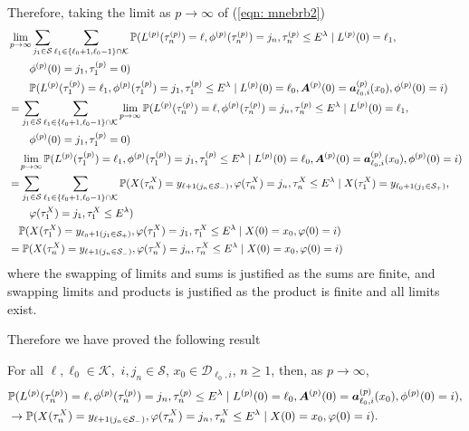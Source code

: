 Therefore, taking the limit as \(p\to \infty \) of (\ref{eqn: mnebrb2}) 
\begin{align}
	&\lim_{p\to\infty}\sum_{j_1\in\mathcal S}\sum_{\ell_1\in\{\ell_0+1,\ell_0-1\}\cap \mathcal K}\mathbb P(L^{(p)}(\tau_n^{(p)}) = \ell, \phi^{(p)}(\tau_n^{(p)}) = j_n, \tau_{n}^{(p)}\leq E^\lambda 
	 \mid L^{(p)}(0)=\ell_1, \nonumber
	  \\&\qquad  \phi^{(p)}(0)=j_1, 
	 \tau_1^{(p)}=0) \nonumber 
	 \\&\qquad \mathbb P(L^{(p)}(\tau_1^{(p)})=\ell_1, \phi^{(p)}(\tau_1^{(p)}) = j_1, \tau_{1}^{(p)}\leq E^\lambda
	 \mid L^{(p)}(0)=\ell_0, \boldsymbol A^{(p)}(0)=\boldsymbol  a_{\ell_0,i}^{(p)}(x_0), \phi^{(p)}(0)=i) \nonumber
	 \\&= \sum_{j_1\in\mathcal S}\sum_{\ell_1\in\{\ell_0+1,\ell_0-1\}\cap \mathcal K} \lim_{p\to\infty} \mathbb P(L^{(p)}(\tau_n^{(p)}) = \ell, \phi^{(p)}(\tau_n^{(p)}) = j_n, \tau_{n}^{(p)}\leq E^\lambda 
	 \mid L^{(p)}(0)=\ell_1, \nonumber
	  \\&\qquad  \phi^{(p)}(0)=j_1, \tau_1^{(p)}=0) \nonumber
	 \\&\quad \lim_{p\to\infty}\mathbb P(L^{(p)}(\tau_1^{(p)})=\ell_1, \phi^{(p)}(\tau_1^{(p)}) = j_1, \tau_{1}^{(p)}\leq E^\lambda
	 \mid L^{(p)}(0)=\ell_0, \boldsymbol A^{(p)}(0)=\boldsymbol  a_{\ell_0,i}^{(p)}(x_0), \phi^{(p)}(0)=i)\nonumber
	 \\&= \sum_{j_1\in\mathcal S}\sum_{\ell_1\in\{\ell_0+1,\ell_0-1\}\cap \mathcal K} \mathbb P(X(\tau_n^X) = y_{\ell+1(j_{n}\in\mathcal S_-)}, 
		\varphi(\tau_n^X) = j_n, \tau_{n}^X\leq E^\lambda \mid X(\tau_1^X)=y_{\ell_{0}+1(j_{1}\in\mathcal S_+)},\nonumber
		\\&\qquad{} \varphi(\tau_1^X)=j_{1},\tau_1^X\leq E^\lambda) \nonumber
	 \\&\quad \mathbb P(X(\tau_1^X)=y_{\ell_{0}+1(j_{1}\in\mathcal S_+)},
		\varphi(\tau_1^X)=j_{1},\tau_1^X\leq E^\lambda
		\mid X(0)=x_0, \varphi(0)=i) \nonumber
	\\&=\mathbb P(X(\tau_n^X) = y_{\ell+1(j_{n}\in\mathcal S_-)}, 
		\varphi(\tau_n^X) = j_n, \tau_{n}^X\leq E^\lambda
		\mid X(0)=x_0, \varphi(0)=i)
	 \label{eqn: mnebrb22}
\end{align}
where the swapping of limits and sums is justified as the sums are finite, and swapping limits and products is justified as the product is finite and all limits exist. 

Therefore we have proved the following result 
\begin{lem}\label{lem: kKKJJJF}
	For all \(\ell,\ell_0\in\mathcal K,\) \(i,j_n\in\mathcal S\), \(x_0\in\mathcal D_{\ell_0,i}\), \(n\geq 1\), then, as \(p\to\infty\),
	\begin{align}
		&\mathbb P(L^{(p)}(\tau_n^{(p)}) = \ell, \phi^{(p)}(\tau_n^{(p)}) = j_n, \tau_{n}^{(p)}\leq E^{\lambda}
		 \mid L^{(p)}(0)=\ell_0, \boldsymbol A^{(p)}(0)=\boldsymbol  a_{\ell_0,i}^{(p)}(x_0), \phi^{(p)}(0)=i),\nonumber 
		 \\&\to \mathbb P(X(\tau_n^X) = y_{\ell+1(j_{n}\in\mathcal S_-)}, 
		\varphi(\tau_n^X) = j_n, \tau_{n}^X\leq E^\lambda
		\mid X(0)=x_0, \varphi(0)=i).
	\end{align}
\end{lem} 

